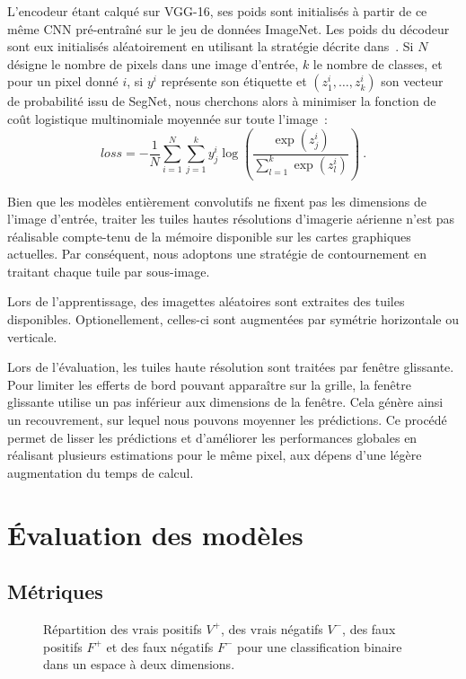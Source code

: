 L'encodeur étant calqué sur VGG-16, ses poids sont initialisés à partir de ce même CNN pré-entraîné sur le jeu de données ImageNet. Les poids du décodeur sont eux initialisés aléatoirement en utilisant la stratégie décrite dans~\cite{he_delving_2015}. Si $N$ désigne le nombre de pixels dans une image d'entrée, $k$ le nombre de classes, et pour un pixel donné $i$, si $y^i$ représente son étiquette et $(z^i_1,\dots, z^i_k)$ son vecteur de probabilité issu de SegNet, nous cherchons alors à minimiser la fonction de coût logistique multinomiale moyennée sur toute l'image~:
\begin{equation}
loss = - \frac{1}{N} \sum_{i=1}^N \sum_{j=1}^k y_j^i \log\left(\frac{\exp(z_j^i)}{\sum\limits_{l=1}^k \exp(z_l^i)}\right)~.
\end{equation}


Bien que les modèles entièrement convolutifs ne fixent pas les dimensions de l'image d'entrée, traiter les tuiles hautes résolutions d'imagerie aérienne n'est pas réalisable compte-tenu de la mémoire disponible sur les cartes graphiques actuelles. Par conséquent, nous adoptons une stratégie de contournement en traitant chaque tuile par sous-image.

Lors de l'apprentissage, des imagettes aléatoires sont extraites des tuiles disponibles. Optionellement, celles-ci sont augmentées par symétrie horizontale ou verticale.

Lors de l'évaluation, les tuiles haute résolution sont traitées par fenêtre glissante. Pour limiter les efferts de bord pouvant apparaître sur la grille, la fenêtre glissante utilise un pas inférieur aux dimensions de la fenêtre. Cela génère ainsi un recouvrement, sur lequel nous pouvons moyenner les prédictions. Ce procédé permet de lisser les prédictions et d'améliorer les performances globales en réalisant plusieurs estimations pour le même pixel, aux dépens d'une légère augmentation du temps de calcul.

\section{Évaluation des modèles}

\subsection{Métriques}

\def\tp{V^+}
\def\tn{V^-}
\def\fp{F^+}
\def\fn{F^-}

\begin{figure}
	\resizebox{\textwidth}{!}{%
	
	}
	\caption{Répartition des vrais positifs $V^+$, des vrais négatifs $V^-$, des faux positifs $F^+$ et des faux négatifs $F^-$ pour une classification binaire dans un espace à deux dimensions.}
	\label{fig:classification_binaire}
\end{figure}

